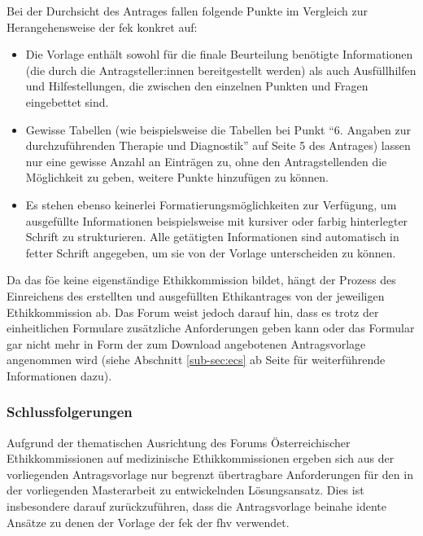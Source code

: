 \documentclass[a4paper,12pt,twoside]{scrreprt}
\begin{document}
Bei der Durchsicht des Antrages fallen folgende Punkte im Vergleich zur Herangehensweise der \ac{fek} konkret auf:
\begin{itemize}
    \item Die Vorlage enthält sowohl für die finale Beurteilung benötigte Informationen (die durch die Antragsteller:innen bereitgestellt werden) als auch Ausfüllhilfen und Hilfestellungen, die zwischen den einzelnen Punkten und Fragen eingebettet sind.
    \item Gewisse Tabellen (wie beispielsweise die Tabellen bei Punkt \enquote{6. Angaben zur durchzuführenden Therapie und Diagnostik} auf Seite 5 des Antrages) lassen nur eine gewisse Anzahl an Einträgen zu, ohne den Antragstellenden die Möglichkeit zu geben, weitere Punkte hinzufügen zu können.
    \item Es stehen ebenso keinerlei Formatierungsmöglichkeiten zur Verfügung, um ausgefüllte Informationen beispielsweise mit kursiver oder farbig hinterlegter Schrift zu strukturieren. Alle getätigten Informationen sind automatisch in fetter Schrift angegeben, um sie von der Vorlage unterscheiden zu können.
\end{itemize}

Da das \ac{föe} keine eigenständige Ethikkommission bildet, hängt der Prozess des Einreichens des erstellten und ausgefüllten Ethikantrages von der jeweiligen Ethikkommission ab. Das Forum weist jedoch darauf hin, dass es trotz der einheitlichen Formulare zusätzliche Anforderungen geben kann oder das Formular gar nicht mehr in Form der zum Download angebotenen Antragsvorlage angenommen wird (siehe Abschnitt \ref{sub-sec:ecs} ab Seite \pageref{sub-sec:ecs} für weiterführende Informationen dazu). \cite{ethikkommission_der_medizinischen_universitat_graz_download_2012}

\subsubsection*{Schlussfolgerungen}
\label{sub-sub-sec:schlussfolgerungen-föe}

Aufgrund der thematischen Ausrichtung des Forums Österreichischer Ethikkommissionen auf medizinische Ethikkommissionen ergeben sich aus der vorliegenden Antragsvorlage nur begrenzt übertragbare Anforderungen für den in der vorliegenden Masterarbeit zu entwickelnden Lösungsansatz. Dies ist insbesondere darauf zurückzuführen, dass die Antragsvorlage beinahe idente Ansätze zu denen der Vorlage der \acl{fek} der \acl{fhv} verwendet.
\end{document}
